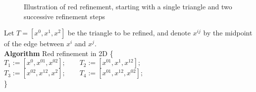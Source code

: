 \begin{figure}[h!]
    \caption{Illustration of red refinement, starting with a single triangle and two successive refinement steps}
    \label{Fig3}%
    \end{figure}

    Let $T = [x^0, x^1, x^2]$ be the triangle to be refined, and denote $x^{ij}$ by the midpoint of the edge between $x^i$ and $x^j$.\\
    \textbf{Algorithm} Red refinement in 2D \{\\
    $T_1 := [x^0, x^{01}, x^{02}]; \qquad T_2 := [x^{01}, x^{1}, x^{12}];$\\
    $T_3 := [x^{02}, x^{12}, x^2]; \qquad T_4 := [x^{01}, x^{12}, x^{02}];$\\
    \}



